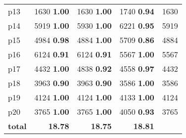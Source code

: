 \begin{tabular}{lrrrr}
\multicolumn{1}{l|}{p13} & {\footnotesize 1630} \textbf{1.00} & {\footnotesize 1630} \textbf{1.00} & {\footnotesize 1740} \textbf{0.94} & \multicolumn{1}{|r}{1630}\\
\multicolumn{1}{l|}{p14} & {\footnotesize 5919} \textbf{1.00} & {\footnotesize 5930} \textbf{1.00} & {\footnotesize 6221} \textbf{0.95} & \multicolumn{1}{|r}{5919}\\
\multicolumn{1}{l|}{p15} & {\footnotesize 4984} \textbf{0.98} & {\footnotesize 4884} \textbf{1.00} & {\footnotesize 5709} \textbf{0.86} & \multicolumn{1}{|r}{4884}\\
\multicolumn{1}{l|}{p16} & {\footnotesize 6124} \textbf{0.91} & {\footnotesize 6124} \textbf{0.91} & {\footnotesize 5567} \textbf{1.00} & \multicolumn{1}{|r}{5567}\\
\multicolumn{1}{l|}{p17} & {\footnotesize 4432} \textbf{1.00} & {\footnotesize 4838} \textbf{0.92} & {\footnotesize 4558} \textbf{0.97} & \multicolumn{1}{|r}{4432}\\
\multicolumn{1}{l|}{p18} & {\footnotesize 3963} \textbf{0.90} & {\footnotesize 3963} \textbf{0.90} & {\footnotesize 3586} \textbf{1.00} & \multicolumn{1}{|r}{3586}\\
\multicolumn{1}{l|}{p19} & {\footnotesize 4124} \textbf{1.00} & {\footnotesize 4124} \textbf{1.00} & {\footnotesize 4133} \textbf{1.00} & \multicolumn{1}{|r}{4124}\\
\multicolumn{1}{l|}{p20} & {\footnotesize 3765} \textbf{1.00} & {\footnotesize 3765} \textbf{1.00} & {\footnotesize 4050} \textbf{0.93} & \multicolumn{1}{|r}{3765}\\
\midrule
\textbf{total} & \textbf{18.78} & \textbf{18.75} & \textbf{18.81} & \\
\bottomrule
\end{tabular}

